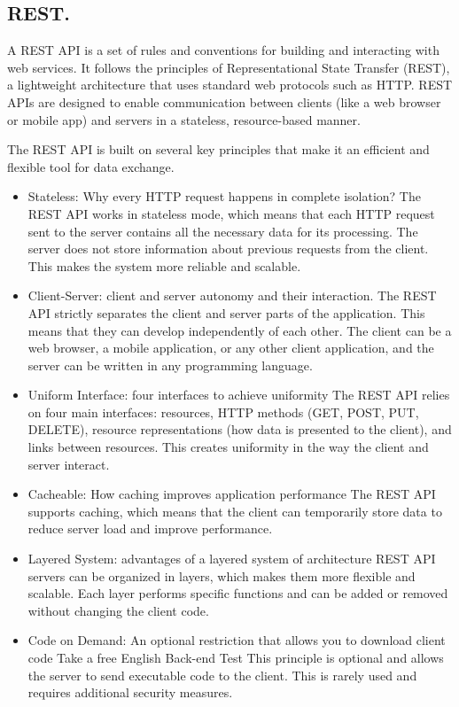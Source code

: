 
\pagebreak
\begin{center}
\section*{REST.}
\end{center}

\medskip

A REST API is a set of rules and conventions for building and interacting with web services. It follows the principles of Representational State Transfer (REST), a lightweight architecture that uses standard web protocols such as HTTP. REST APIs are designed to enable communication between clients (like a web browser or mobile app) and servers in a stateless, resource-based manner.

The REST API is built on several key principles that make it an efficient and flexible tool for data exchange.

\begin{itemize}
\item Stateless: Why every HTTP request happens in complete isolation?
The REST API works in stateless mode, which means that each HTTP request sent to the server contains all the necessary data for its processing. The server does not store information about previous requests from the client. This makes the system more reliable and scalable.

\item Client-Server: client and server autonomy and their interaction.
The REST API strictly separates the client and server parts of the application. This means that they can develop independently of each other. The client can be a web browser, a mobile application, or any other client application, and the server can be written in any programming language.

\item Uniform Interface: four interfaces to achieve uniformity
The REST API relies on four main interfaces: resources, HTTP methods (GET, POST, PUT, DELETE), resource representations (how data is presented to the client), and links between resources. This creates uniformity in the way the client and server interact.

\item Cacheable: How caching improves application performance
The REST API supports caching, which means that the client can temporarily store data to reduce server load and improve performance.

\item Layered System: advantages of a layered system of architecture
REST API servers can be organized in layers, which makes them more flexible and scalable. Each layer performs specific functions and can be added or removed without changing the client code.

\item Code on Demand: An optional restriction that allows you to download client code
Take a free English Back-end Test
This principle is optional and allows the server to send executable code to the client. This is rarely used and requires additional security measures.
\end{itemize}

